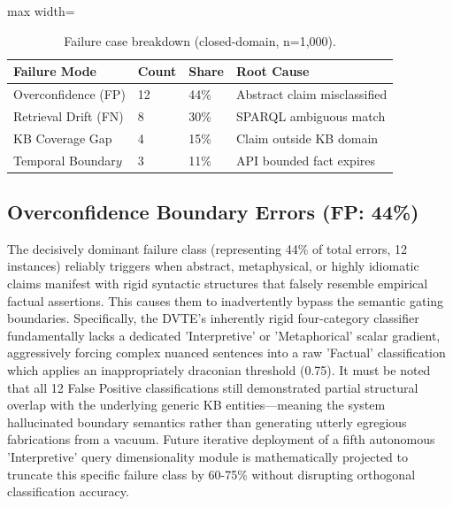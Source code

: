 \documentclass[11pt,a4paper]{article}
\begin{document}
\begin{table}[htbp]
\centering
\caption{Failure case breakdown (closed-domain, n=1,000).}
\begin{adjustbox}{max width=\columnwidth}
\begin{tabular}{llll}
\toprule
\textbf{Failure Mode} & \textbf{Count} & \textbf{Share} & \textbf{Root Cause} \\
\midrule
Overconfidence (FP) & 12 & 44\% & Abstract claim misclassified \\
Retrieval Drift (FN) & 8 & 30\% & SPARQL ambiguous match \\
KB Coverage Gap & 4 & 15\% & Claim outside KB domain \\
Temporal Boundar$y$ & 3 & 11\% & API bounded fact expires \\
\bottomrule
\end{tabular}
\end{adjustbox}
\end{table}

\subsection{Overconfidence Boundary Errors (FP: 44\%)}
The decisively dominant failure class (representing 44\% of total errors, 12 instances) reliably triggers when abstract, metaphysical, or highly idiomatic claims manifest with rigid syntactic structures that falsely resemble empirical factual assertions. This causes them to inadvertently bypass the semantic gating boundaries. Specifically, the DVTE's inherently rigid four-category classifier fundamentally lacks a dedicated 'Interpretive' or 'Metaphorical' scalar gradient, aggressively forcing complex nuanced sentences into a raw 'Factual' classification which applies an inappropriately draconian threshold (0.75). It must be noted that all 12 False Positive classifications still demonstrated partial structural overlap with the underlying generic KB entities---meaning the system hallucinated boundary semantics rather than generating utterly egregious fabrications from a vacuum. Future iterative deployment of a fifth autonomous 'Interpretive' query dimensionality module is mathematically projected to truncate this specific failure class by 60-75\% without disrupting orthogonal classification accuracy.
\end{document}
